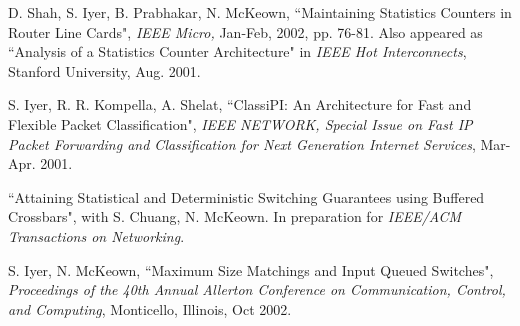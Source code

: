 \documentclass[a4paper, 12pt]{article}
\begin{document}
\begin{footnotesize}
\begin{thebibliography}{}
D. Shah, S. Iyer, B. Prabhakar, N. McKeown,
``Maintaining Statistics Counters in Router Line Cards", {\it IEEE Micro,} Jan-Feb, 2002, pp.
76-81. Also appeared as ``Analysis of a Statistics Counter Architecture"  in {\it IEEE Hot Interconnects}, Stanford University, Aug. 2001.

S. Iyer, R. R. Kompella, A. Shelat, ``ClassiPI: An Architecture for Fast and Flexible Packet Classification", {\it IEEE NETWORK, Special Issue on Fast IP Packet Forwarding and Classification
for Next Generation Internet Services}, Mar-Apr. 2001.

``Attaining Statistical and Deterministic Switching Guarantees using Buffered
Crossbars", with S. Chuang, N. McKeown. In preparation for {\it IEEE/ACM Transactions
on Networking}.

S. Iyer, N. McKeown, ``Maximum Size Matchings and Input Queued Switches",
{\it Proceedings of the 40th Annual Allerton Conference on Communication, Control, and
Computing}, Monticello, Illinois, Oct 2002.



\end{thebibliography}
\end{footnotesize}
\end{document}
